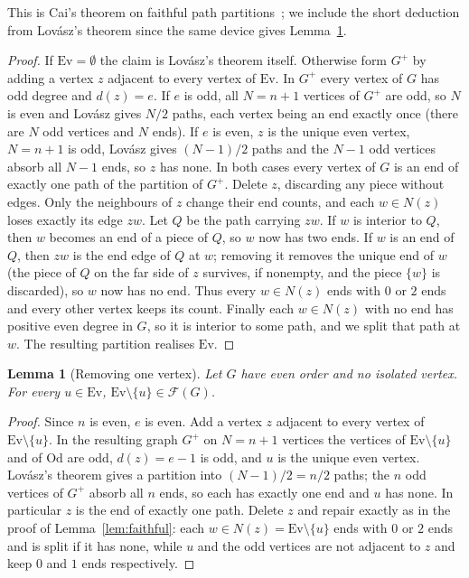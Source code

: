 \documentclass[11pt]{amsart}
\newtheorem{lemma}[theorem]{Lemma}
\theoremstyle{definition}
\newcommand{\cF}{\mathcal F}
\newcommand{\Ev}{\mathrm{Ev}}
\newcommand{\Od}{\mathrm{Od}}
\begin{document}
This is Cai's theorem on faithful path partitions~\cite{Cai}; we include the short deduction from
Lov\'asz's theorem since the same device gives Lemma~\ref{lem:minus}.

\begin{proof}
If $\Ev=\emptyset$ the claim is Lov\'asz's theorem itself. Otherwise form $G^+$ by adding a vertex
$z$ adjacent to every vertex of $\Ev$. In $G^+$ every vertex of $G$ has odd degree and $d(z)=e$.
If $e$ is odd, all $N=n+1$ vertices of $G^+$ are odd, so $N$ is even and Lov\'asz gives $N/2$ paths,
each vertex being an end exactly once (there are $N$ odd vertices and $N$ ends). If $e$ is even, $z$
is the unique even vertex, $N=n+1$ is odd, Lov\'asz gives $(N-1)/2$ paths and the $N-1$ odd vertices
absorb all $N-1$ ends, so $z$ has none. In both cases every vertex of $G$ is an end of exactly one path of the partition of
$G^+$. Delete $z$, discarding any piece without edges. Only the neighbours of $z$ change their end
counts, and each $w\in N(z)$ loses exactly its edge $zw$. Let $Q$ be the path carrying $zw$. If $w$ is
interior to $Q$, then $w$ becomes an end of a piece of $Q$, so $w$ now has two ends. If $w$ is an end of
$Q$, then $zw$ is the end edge of $Q$ at $w$; removing it removes the unique end of $w$ (the piece of
$Q$ on the far side of $z$ survives, if nonempty, and the piece $\{w\}$ is discarded), so $w$ now has no
end. Thus every $w\in N(z)$ ends with $0$ or $2$ ends and every other vertex keeps its count. Finally
each $w\in N(z)$ with no end has positive even degree in $G$, so it is interior to some path, and we
split that path at $w$. The resulting partition realises $\Ev$.
\end{proof}

\begin{lemma}[Removing one vertex]\label{lem:minus}
Let $G$ have even order and no isolated vertex. For every $u\in\Ev$, $\Ev\setminus\{u\}\in\cF(G)$.
\end{lemma}

\begin{proof}
Since $n$ is even, $e$ is even. Add a vertex $z$ adjacent to every vertex of $\Ev\setminus\{u\}$. In the
resulting graph $G^+$ on $N=n+1$ vertices the vertices of $\Ev\setminus\{u\}$ and of $\Od$ are odd,
$d(z)=e-1$ is odd, and $u$ is the unique even vertex. Lov\'asz's theorem gives a partition into
$(N-1)/2=n/2$ paths; the $n$ odd vertices of $G^+$ absorb all $n$ ends, so each has exactly one end
and $u$ has none. In particular $z$ is the end of exactly one path. Delete $z$ and repair exactly as
in the proof of Lemma~\ref{lem:faithful}: each $w\in N(z)=\Ev\setminus\{u\}$ ends with $0$ or $2$
ends and is split if it has none, while $u$ and the odd vertices are not adjacent to $z$ and keep $0$
and $1$ ends respectively.
\end{proof}
\end{document}
